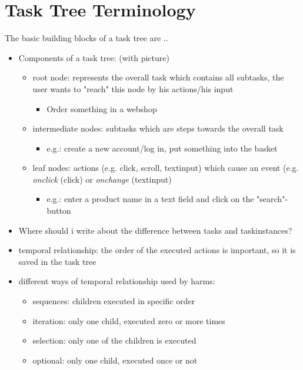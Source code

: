 \section{Task Tree Terminology}
\label{sec:foundationtasktreeterminology}
	The basic building blocks of a task tree are ..
\begin{itemize} 
	
	\item Components of a task tree: (with picture)
	\begin{itemize}
		\item root node: represents the overall task which contains all subtasks, the user wants to "reach" this node by his actions/his input
		\begin{itemize}
    			\item Order something in a webshop
		\end{itemize}
		\item intermediate nodes: subtasks which are steps towards the overall task
		\begin{itemize}
			\item e.g.: create a new account/log in, put something into the basket
		\end{itemize}
		\item leaf nodes: actions (e.g. click, scroll, textinput) which cause an event (e.g. \textit{onclick} (click) or \textit{onchange} (textinput)
		\begin{itemize}
			\item e.g.: enter a product name in a text field and click on the "search"-button
		\end{itemize}
	\end{itemize}
	\item Where should i write about the difference between tasks and taskinstances? 	
	\item temporal relationship: the order of the executed actions is important, so it is saved in the task tree
	\item different ways of temporal relationship used by harms: 
	\begin{itemize}
		\item sequences: children executed in specific order
		\item iteration: only one child, executed zero or more times
		\item selection: only one of the children is executed
		\item optional:  only one child, executed once or not
	\end{itemize}	
	

\end{itemize}
